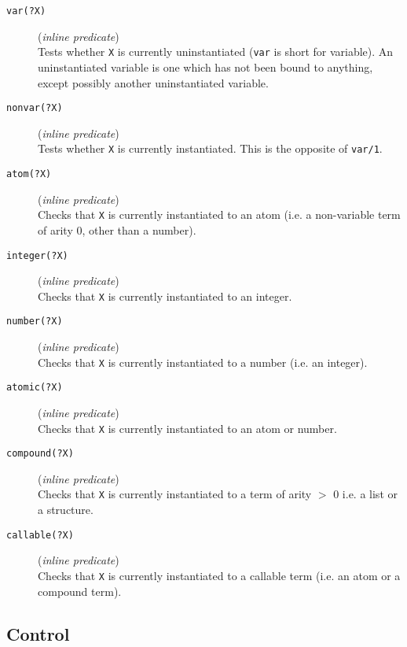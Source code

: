 \begin{description}
\item [{\tt var(?X)}] ({\em inline predicate})~\\
	Tests whether {\tt X} is currently uninstantiated ({\tt var}
	is short for variable).  An uninstantiated variable is one which has
	not been bound to anything, except possibly another
	uninstantiated variable. 	

\item [{\tt nonvar(?X)}] ({\em inline predicate})~\\
	Tests whether {\tt X} is currently instantiated.  This is the
	opposite of {\tt var/1}.

\item [{\tt atom(?X)}] ({\em inline predicate})~\\
	Checks that {\tt X} is currently instantiated to an atom (i.e. a
	non-variable term of arity 0, other than a number). 

\item [{\tt integer(?X)}] ({\em inline predicate})~\\
	Checks that {\tt X} is currently instantiated to an integer.  

\item [{\tt number(?X)}] ({\em inline predicate})~\\
	Checks that {\tt X} is currently instantiated to a number
	(i.e. an integer).  

\item [{\tt atomic(?X)}] ({\em inline predicate})~\\
	Checks that {\tt X} is currently instantiated to an atom or number.

\item [{\tt compound(?X)}] ({\em inline predicate})~\\
	Checks that {\tt X} is currently instantiated to a term of arity $>$
	0 i.e. a list or a structure.

\item [{\tt callable(?X)}] ({\em inline predicate})~\\
	Checks that {\tt X} is currently instantiated to a callable
	term (i.e. an atom or a compound term).
	

\end{description}



\subsection{Control}
\label{control}


